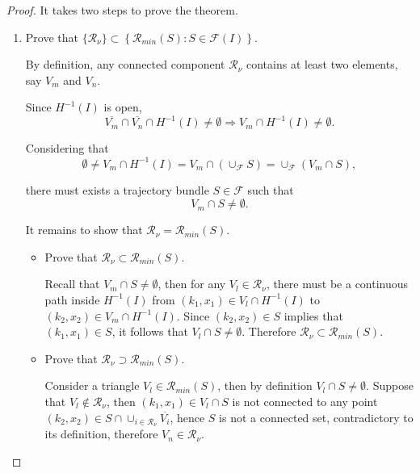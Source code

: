 \documentclass{article}
\numberwithin{equation}{section}
\begin{document}
\begin{proof}
    It takes two steps to prove the theorem.
    \begin{enumerate}
        \item Prove that $\{\mathcal{R}_{\nu}\} \subset \left\{ \mathcal{R}_{min}(S):S\in\mathcal{F}(I)\right\} $.

        By definition, any connected component $\mathcal{R}_{\nu}$ contains at least two elements, say $V_{m}$ and $V_{n}$. 
        
        Since $H^{-1}(I)$ is open,
        \begin{equation*}
            \overline{V_{m}}\cap\overline{V_{n}}\cap H^{-1}(I)\neq\emptyset\Rightarrow V_{m}\cap H^{-1}(I)\neq\emptyset.
        \end{equation*}

        Considering that
        \begin{equation*}
            \emptyset \neq V_{m}\cap H^{-1}(I)=V_{m}\cap\left(\cup_{\mathcal{F}}S\right)=\cup_{\mathcal{F}}\left(V_{m}\cap S\right),
        \end{equation*}
        
        there must exists a trajectory bundle $S\in \mathcal{F}$ such that
        \begin{equation*}
            V_{m}\cap S \neq \emptyset.
        \end{equation*}

        It remains to show that $\mathcal{R}_{\nu}=\mathcal{R}_{min}(S)$.
        \begin{itemize}
            \item Prove that $\mathcal{R}_{\nu} \subset \mathcal{R}_{min}(S)$.

            Recall that $V_{m}\cap S \neq \emptyset$, then for any $V_{l}\in \mathcal{R}_{\nu}$, there must be a continuous path inside $H^{-1}(I)$ from $(k_{1}, x_{1}) \in V_{l}\cap H^{-1}(I)$ to  $(k_{2}, x_{2}) \in V_{m}\cap H^{-1}(I)$. 
            Since $(k_{2}, x_{2}) \in S$ implies that $(k_{1}, x_{1}) \in S$, it follows that $V_{l}\cap S \neq \emptyset$. Therefore $\mathcal{R}_{\nu} \subset \mathcal{R}_{min}(S)$.
            
            \item Prove that $\mathcal{R}_{\nu} \supset \mathcal{R}_{min}(S)$.

            Consider a triangle $V_{l} \in \mathcal{R}_{min}(S)$, then by definition $V_{l} \cap S \neq \emptyset$. Suppose that $V_{l} \notin \mathcal{R}_{\nu}$, then $(k_{1}, x_{1})\in V_{l} \cap S$ is not connected to any point $(k_{2}, x_{2}) \in S\cap\cup_{i\in\mathcal{R}_{\nu}}\overline{V_{i}}$, hence $S$ is not a connected set, contradictory to its definition, therefore $V_{n} \in \mathcal{R}_{\nu}$.
        \end{itemize}
        

\end{enumerate}
\end{proof}
\end{document}
